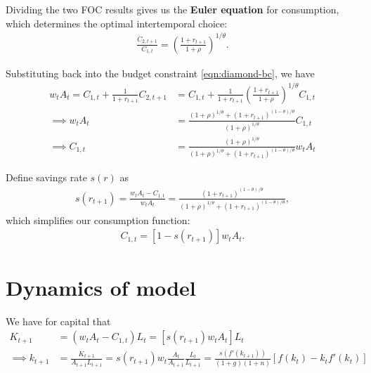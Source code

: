 \documentclass[../main.tex]{subfiles}
\begin{document}
        Dividing the two FOC results gives us the \textbf{Euler equation} for consumption, which determines the optimal intertemporal choice:
        \begin{align}
            \frac{C_{2, t+1}}{C_{1, t}}
            = \left(\frac{1+r_{t+1}}{1+\rho}\right)^{1/\theta}.
            \label{eqn:diamond-euler}
        \end{align}
        
        Substituting back into the budget constraint \eqref{eqn:diamond-bc}, we have
        \begin{align}
            w_t A_t
            = C_{1, t} + \frac{1}{1+r_{t+1}} C_{2, t+1}
            &= C_{1, t} + \frac{1}{1+r_{t+1}} \left(\frac{1+r_{t+1}}{1+\rho}\right)^{1/\theta} C_{1, t}
            \\
            \implies
            w_t A_t
            &= \frac{
                (1+\rho)^{1/\theta} + (1+r_{t+1})^{(1-\theta)/\theta}}{
                (1+\rho)^{1/\theta}
                }
            C_{1, t}
            \\
            \implies
            C_{1, t}
            &=
            \frac{
                (1+\rho)^{1/\theta}
            }{
                (1+\rho)^{1/\theta} + (1+r_{t+1})^{(1-\theta)/\theta}
            }
                w_tA_t
        \end{align}
        
        Define savings rate $s(r)$ as
        \begin{align}
            s(r_{t+1})
            = \frac{w_t A_t - C_{1,t}}{w_t A_t}
            =\frac{
                (1+r_{t+1})^{(1-\theta)/\theta}
            }{
                (1+\rho)^{1/\theta} + (1+r_{t+1})^{(1-\theta)/\theta}
            },
        \end{align}
        which simplifies our consumption function:
        \begin{align}
            C_{1, t} = [1-s(r_{t+1})] w_t A_t.
        \end{align}
        
    \vspace{0.5cm}
    \section{Dynamics of model}
        
        We have for capital that
        \begin{align}
            K_{t + 1}
            &= (w_t A_t - C_{1, t})L_t
            = [s(r_{t+1})w_t A_t] L_t
            \\
            \implies
            k_{t+1} &= \frac{K_{t+1}}{A_{t+1} L_{t+1}} = s(r_{t+1})w_t \frac{A_t}{A_{t+1}}
            \frac{L_t}{L_{t+1}}
            =
            \frac{s(f'(k_{t+1}))}{(1+g)(1+n)}
            [f(k_t) - k_t f'(k_t)]
        \end{align}
        
\end{document}
